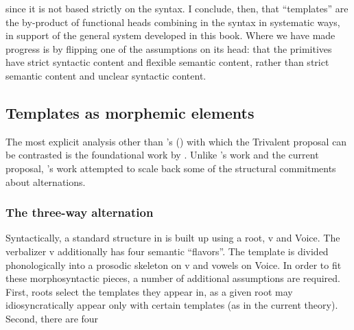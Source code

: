 \begin{exe}
\begin{xlist}
\begin{xlist}
\begin{exe}
\begin{xlist}
\begin{xlist}
\begin{exe}
\begin{xlist}
\begin{xlist}
\begin{exe}
\begin{exe}
\begin{xlist}
\begin{exe}
\begin{exe}
\begin{xlist}
\begin{exe}
\begin{exe}
\begin{exe}
\begin{exe}
\begin{exe}
\begin{xlist}
\begin{exe}
\begin{xlist}
\begin{exe}
\begin{exe}
\begin{xlist}
\begin{exe}
\begin{xlist}
\begin{exe}
\begin{xlist}
\begin{exe}
\begin{exe}
\begin{exe}
\begin{xlist}
\begin{exe}
\begin{exe}
\begin{exe}
\begin{xlist}
\begin{exe}
\begin{xlist}
\begin{exe}
\begin{exe}
\begin{xlist}
\begin{exe}
\begin{exe}
\begin{exe}
\begin{exe}
\begin{xlist}
\begin{exe}
\begin{xlist}
\begin{exe}
\begin{xlist}
\begin{exe}
\begin{xlist}
\begin{exe}
\begin{xlist}
\begin{exe}
\begin{xlist}
\begin{exe}
\begin{exe}
\begin{xlist}
\begin{exe}
\begin{xlist}
\begin{exe}
\begin{exe}
\begin{xlist}
\begin{exe}
\begin{xlist}
\begin{exe}
\begin{exe}
\begin{exe}
\begin{exe}
\begin{xlist}
\begin{xlist}
\begin{exe}
\begin{xlist}
\begin{exe}
\begin{exe}
\begin{exe}
\begin{xlist}
\begin{exe}
\begin{exe}
\begin{xlist}
\begin{exe}
\begin{exe}
\begin{exe}
\begin{xlist}
\begin{xlist}
\begin{exe}
\begin{xlist}
\begin{exe}
\begin{exe}
\begin{exe}
\begin{exe}
\begin{xlist}
\begin{exe}
\begin{xlist}
\begin{exe}
\begin{xlist}
\begin{exe}
\begin{xlist}
\begin{exe}
\begin{exe}
\begin{exe}
\begin{exe}
\begin{exe}
\begin{xlist}
\begin{exe}
\begin{xlist}
\begin{exe}
\begin{xlist}
\begin{xlist}
\begin{exe}
\begin{xlist}
\begin{exe}
\begin{xlist}
\begin{exe}
\begin{xlist}
since it is not based strictly on the syntax. I conclude, then, that ``templates'' are the by-product of functional heads combining in the syntax in systematic ways, in support of the general system developed in this book. Where we have made progress is by flipping one of the assumptions on its head: that the primitives have strict syntactic content and flexible semantic content, rather than strict semantic content and unclear syntactic content.
	\subsection{Templates as morphemic elements} \label{vz:others:morph}
The most explicit analysis other than \citeauthor{doron03}'s (\citeyear{doron03}) with which the Trivalent proposal can be contrasted is the foundational work by \cite{arad03,arad05}. Unlike \citeauthor{doron03}'s work and the current proposal, \cite{arad05}'s work attempted to scale back some of the structural commitments about alternations.

		\subsubsection{The three-way alternation}
Syntactically, a standard structure in \cite{arad05} is built up using a root, v and Voice. The verbalizer v additionally has four semantic ``flavors''. The template is divided phonologically into a prosodic skeleton on v and vowels on Voice. In order to fit these morphosyntactic pieces, a number of additional assumptions are required. First, roots select the templates they appear in, as a given root may idiosyncratically appear only with certain templates (as in the current theory). Second, there are four 
\end{xlist}
\end{exe}
\end{xlist}
\end{exe}
\end{xlist}
\end{exe}
\end{xlist}
\end{xlist}
\end{exe}
\end{xlist}
\end{exe}
\end{xlist}
\end{exe}
\end{exe}
\end{exe}
\end{exe}
\end{exe}
\end{xlist}
\end{exe}
\end{xlist}
\end{exe}
\end{xlist}
\end{exe}
\end{xlist}
\end{exe}
\end{exe}
\end{exe}
\end{exe}
\end{xlist}
\end{exe}
\end{xlist}
\end{xlist}
\end{exe}
\end{exe}
\end{exe}
\end{xlist}
\end{exe}
\end{exe}
\end{xlist}
\end{exe}
\end{exe}
\end{exe}
\end{xlist}
\end{exe}
\end{xlist}
\end{xlist}
\end{exe}
\end{exe}
\end{exe}
\end{exe}
\end{xlist}
\end{exe}
\end{xlist}
\end{exe}
\end{exe}
\end{xlist}
\end{exe}
\end{xlist}
\end{exe}
\end{exe}
\end{xlist}
\end{exe}
\end{xlist}
\end{exe}
\end{xlist}
\end{exe}
\end{xlist}
\end{exe}
\end{xlist}
\end{exe}
\end{xlist}
\end{exe}
\end{exe}
\end{exe}
\end{exe}
\end{xlist}
\end{exe}
\end{exe}
\end{xlist}
\end{exe}
\end{xlist}
\end{exe}
\end{exe}
\end{exe}
\end{xlist}
\end{exe}
\end{exe}
\end{exe}
\end{xlist}
\end{exe}
\end{xlist}
\end{exe}
\end{xlist}
\end{exe}
\end{exe}
\end{xlist}
\end{exe}
\end{xlist}
\end{exe}
\end{exe}
\end{exe}
\end{exe}
\end{exe}
\end{xlist}
\end{exe}
\end{exe}
\end{xlist}
\end{exe}
\end{exe}
\end{xlist}
\end{xlist}
\end{exe}
\end{xlist}
\end{xlist}
\end{exe}
\end{xlist}
\end{xlist}
\end{exe}
